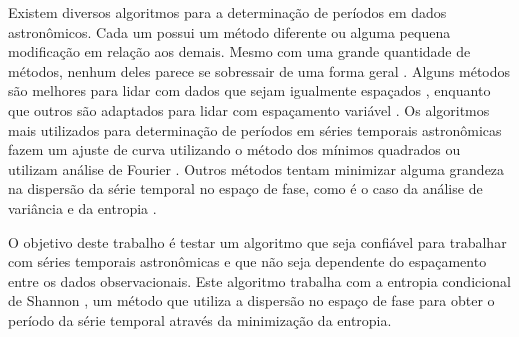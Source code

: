 Existem diversos algoritmos para a determinação de períodos em dados astronômicos. Cada um possui um método diferente ou alguma pequena modificação em relação aos demais. Mesmo com uma grande quantidade de métodos, nenhum deles parece se sobressair de uma forma geral \citep{comparison}. Alguns métodos são melhores para lidar com dados que sejam igualmente espaçados \citep{lomb, mello81}, enquanto que outros são adaptados para lidar com espaçamento variável \citep{aov, ce}. Os algoritmos mais utilizados para determinação de períodos em séries temporais astronômicas fazem um ajuste de curva utilizando o método dos mínimos quadrados \citep{lomb} ou utilizam análise de Fourier \citep{mello81}. Outros métodos tentam minimizar alguma grandeza na dispersão da série temporal no espa\c{c}o de fase, como é o caso da análise de variância \citep{aov} e da entropia \citep{entropy}.



O objetivo deste trabalho é testar um algoritmo que seja confiável para trabalhar com séries temporais astronômicas e que não seja dependente do espaçamento entre os dados observacionais. Este algoritmo trabalha com a entropia condicional de Shannon \citep{ce, Cincotta1999}, um método que utiliza a dispersão no espaço de fase para obter o período da série temporal através da minimização da entropia.


